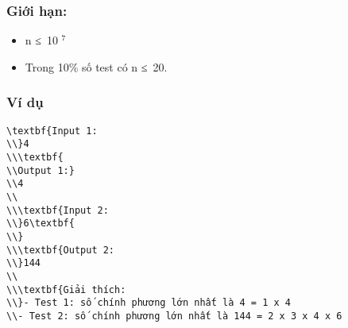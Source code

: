 \subsubsection{\textbf{    Giới hạn:   }}
\begin{itemize}
	\item     n ≤ 10    $^     7    $
	\item     Trong 10\% số test có n ≤ 20.   
\end{itemize}

\subsubsection{   Ví dụ  }
\begin{verbatim}
\textbf{Input 1:
\\}4
\\\textbf{
\\Output 1:}
\\4
\\
\\\textbf{Input 2:
\\}6\textbf{
\\}
\\\textbf{Output 2:
\\}144
\\
\\\textbf{Giải thích:
\\}- Test 1: số chính phương lớn nhất là 4 = 1 x 4
\\- Test 2: số chính phương lớn nhất là 144 = 2 x 3 x 4 x 6\end{verbatim}

